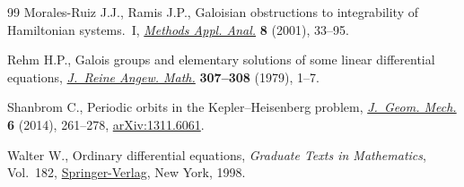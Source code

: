 \documentclass[11pt]{article}
\numberwithin{equation}{section}
\numberwithin{equation}{section}
\begin{document}
\begin{thebibliography}{99}
Morales-Ruiz J.J., Ramis J.P., Galoisian obstructions to integrability of
 {H}amiltonian systems.~{I}, \href{https://doi.org/10.4310/MAA.2001.v8.n1.a3}{\textit{Methods Appl. Anal.}} \textbf{8} (2001),
 33--95.

Rehm H.P., Galois groups and elementary solutions of some linear differential
 equations, \href{https://doi.org/10.1515/crll.1979.307-308.1}{\textit{J.~Reine Angew. Math.}} \textbf{307--308} (1979), 1--7.

Shanbrom C., Periodic orbits in the {K}epler--{H}eisenberg problem,
 \href{https://doi.org/10.3934/jgm.2014.6.261}{\textit{J.~Geom. Mech.}} \textbf{6} (2014), 261--278, \href{https://arxiv.org/abs/1311.6061}{arXiv:1311.6061}.

Walter W., Ordinary differential equations, \textit{Graduate Texts in
 Mathematics}, Vol.~182, \href{https://doi.org/10.1007/978-1-4612-0601-9}{Springer-Verlag}, New York, 1998.

\end{thebibliography}
\end{document}
